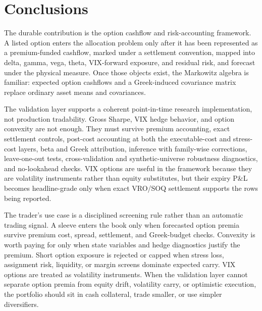 \section{Conclusions}\label{sec:conclusion}

The durable contribution is the option cashflow and risk-accounting framework. A listed
option enters the allocation problem only after it has been represented as a premium-funded
cashflow, marked under a settlement convention, mapped into delta, gamma, vega, theta,
VIX-forward exposure, and residual risk, and forecast under the physical measure. Once
those objects exist, the Markowitz algebra is familiar: expected option cashflows and a
Greek-induced covariance matrix replace ordinary asset means and covariances.

The validation layer supports a coherent point-in-time research implementation, not
production tradability. Gross Sharpe, VIX hedge behavior, and option convexity are not
enough. They must survive premium accounting, exact settlement controls, post-cost
accounting at both the executable-cost and stress-cost layers, beta and Greek attribution,
inference with family-wise corrections, leave-one-out tests, cross-validation and
synthetic-universe robustness diagnostics, and no-lookahead checks. VIX options are useful in the framework because they are volatility
instruments rather than equity substitutes, but their expiry P\&L becomes headline-grade
only when exact VRO/SOQ settlement supports the rows being reported.

The trader's use case is a disciplined screening rule rather than an automatic trading
signal. A sleeve enters the book only when forecasted option premia survive premium cost,
spread, settlement, and Greek-budget checks. Convexity is worth paying for only when state
variables and hedge diagnostics justify the premium. Short option exposure is rejected or
capped when stress loss, assignment risk, liquidity, or margin screens dominate expected
carry. VIX options are treated as volatility instruments. When the validation layer cannot
separate option premia from equity drift, volatility carry, or optimistic execution, the
portfolio should sit in cash collateral, trade smaller, or use simpler diversifiers.

